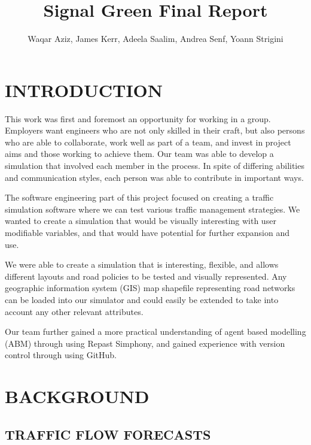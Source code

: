 \documentclass[11pt]{article}
\begin{document}
\title{Signal Green Final Report}

\author{Waqar Aziz, James Kerr, Adeela Saalim, Andrea Senf, Yoann Strigini}

\maketitle 

\listoftables

\section{INTRODUCTION}


This work was first and foremost an opportunity for working in a group. Employers want engineers who are not only skilled in their craft, but also persons who are able to collaborate, work well as part of a team, and invest in project aims and those working to achieve them. Our team was able to develop a simulation that involved each member in the process. In spite of differing abilities and communication styles, each person was able to contribute in important ways.

The software engineering part of this project focused on creating a traffic simulation software where we can test various traffic management strategies. We wanted to create a simulation that would be visually interesting with user modifiable variables, and that would have potential for further expansion and use.

We were able to create a simulation that is interesting, flexible, and allows different layouts and road policies to be tested and visually represented. Any geographic information system (GIS) map shapefile representing road networks can be loaded into our simulator and could easily be extended to take into account any other relevant attributes.

Our team further gained a more practical understanding of agent based modelling (ABM) through using Repast Simphony, and gained experience with version control through using GitHub.

\section{BACKGROUND}

\subsection{TRAFFIC FLOW FORECASTS}
\end{document}
